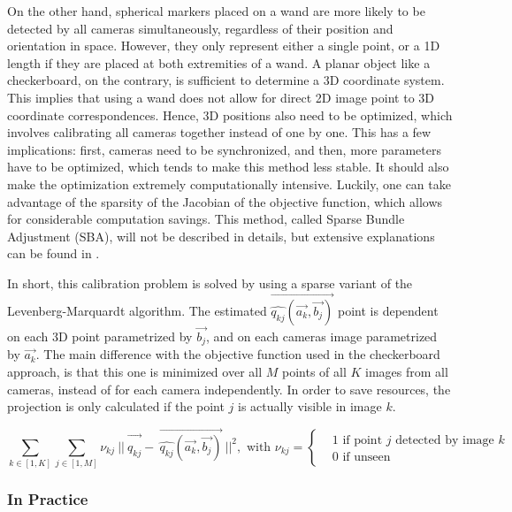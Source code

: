 On the other hand, spherical markers placed on a wand are more likely to be detected by all cameras simultaneously, regardless of their position and orientation in space. However, they only represent either a single point, or a 1D length if they are placed at both extremities of a wand. A planar object like a checkerboard, on the contrary, is sufficient to determine a 3D coordinate system. This implies that using a wand does not allow for direct 2D image point to 3D coordinate correspondences. Hence, 3D positions also need to be optimized, which involves calibrating all cameras together instead of one by one. This has a few implications: first, cameras need to be synchronized, and then, more parameters have to be optimized, which tends to make this method less stable. It should also make the optimization extremely computationally intensive. Luckily, one can take advantage of the sparsity of the Jacobian of the objective function, which allows for considerable computation savings. This method, called Sparse Bundle Adjustment (SBA), will not be described in details, but extensive explanations can be found in \cite{Lourakis2009}.

\newpage
In short, this calibration problem is solved by using a sparse variant of the Levenberg-Marquardt algorithm.  The estimated $\overrightarrow{\widehat{q_{kj}}(\overrightarrow{a_k}, \overrightarrow{b_j})}$ point is dependent on each 3D point parametrized by $\overrightarrow{b_j}$, and on each cameras image parametrized by $\overrightarrow{a_k}$. The main difference with the objective function used in the checkerboard approach, is that this one is minimized over all $M$ points of all $K$ images from all cameras, instead of for each camera independently. In order to save resources, the projection is only calculated if the point $j$ is actually visible in image $k$.

\begin{equation}
  \sum_{k \in [1,K]} \sum_{j \in [1,M]} 
  \nu_{kj} \ ||\ \overrightarrow{q_{kj}^{\ ^{\ ^{\ ^{\ }}}}} - \ 
  \overrightarrow{\widehat{q_{kj}}(\overrightarrow{a_k}, \overrightarrow{b_j})}\ 
  ||^2,  
  \textrm{ with }  
  \nu_{kj} = 
    \begin{cases}
        & 1 \textrm{ if point } j \textrm{ detected by image } k \\
        & 0 \textrm{ if unseen}
    \end{cases}
\end{equation} 


\subsubsection{In Practice}  

